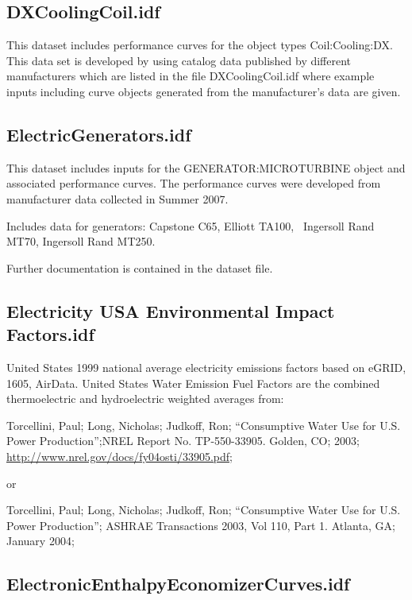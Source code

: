 \subsection{DXCoolingCoil.idf}\label{dxcoolingcoil.idf}

This dataset includes performance curves for the object types Coil:Cooling:DX. This data set is developed by using catalog data published by different manufacturers which are listed in the file DXCoolingCoil.idf where example inputs including curve objects generated from the manufacturer's data are given.

\subsection{ElectricGenerators.idf}\label{electricgenerators.idf}

This dataset includes inputs for the GENERATOR:MICROTURBINE object and associated performance curves. The performance curves were developed from manufacturer data collected in Summer 2007.

Includes data for generators: Capstone C65, Elliott TA100,~ Ingersoll Rand MT70, Ingersoll Rand MT250.

Further documentation is contained in the dataset file.

\subsection{Electricity USA Environmental Impact Factors.idf}\label{electricity-usa-environmental-impact-factors.idf}

United States 1999 national average electricity emissions factors based on eGRID, 1605, AirData. United States Water Emission Fuel Factors are the combined thermoelectric and hydroelectric weighted averages from:

Torcellini, Paul; Long, Nicholas; Judkoff, Ron; ``Consumptive Water Use for U.S. Power Production'';NREL Report No. TP-550-33905. Golden, CO; 2003; \url{http://www.nrel.gov/docs/fy04osti/33905.pdf};

or

Torcellini, Paul; Long, Nicholas; Judkoff, Ron; ``Consumptive Water Use for U.S. Power Production''; ASHRAE Transactions 2003, Vol 110, Part 1. Atlanta, GA; January 2004;

\subsection{ElectronicEnthalpyEconomizerCurves.idf}\label{electronicenthalpyeconomizercurves.idf}

